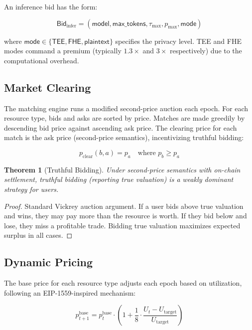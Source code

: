 \documentclass[11pt,a4paper]{article}
\newtheorem{theorem}{Theorem}
\begin{document}
An inference bid has the form:

\begin{equation}
    \mathsf{Bid}_{\text{infer}} = (\mathsf{model}, \mathsf{max\_tokens}, \tau_{\max}, p_{\max}, \mathsf{mode})
\end{equation}

where $\mathsf{mode} \in \{\mathsf{TEE}, \mathsf{FHE}, \mathsf{plaintext}\}$
specifies the privacy level. TEE and FHE modes command a premium (typically
$1.3\times$ and $3\times$ respectively) due to the computational overhead.

\subsection{Market Clearing}

The matching engine runs a modified second-price auction each epoch.
For each resource type, bids and asks are sorted by price. Matches
are made greedily by descending bid price against ascending ask price.
The clearing price for each match is the ask price (second-price
semantics), incentivizing truthful bidding:

\begin{equation}
    p_{\text{clear}}(b, a) = p_a \quad \text{where } p_b \geq p_a
\end{equation}

\begin{theorem}[Truthful Bidding]
Under second-price semantics with on-chain settlement, truthful bidding
(reporting true valuation) is a weakly dominant strategy for users.
\end{theorem}

\begin{proof}
Standard Vickrey auction argument. If a user bids above true valuation
and wins, they may pay more than the resource is worth. If they bid below
and lose, they miss a profitable trade. Bidding true valuation maximizes
expected surplus in all cases.
\end{proof}

\subsection{Dynamic Pricing}

The base price for each resource type adjusts each epoch based on
utilization, following an EIP-1559-inspired mechanism:

\begin{equation}\label{eq:pricing}
    p_{t+1}^{\text{base}} = p_t^{\text{base}} \cdot \left(1 + \frac{1}{8} \cdot \frac{U_t - U_{\text{target}}}{U_{\text{target}}}\right)
\end{equation}
\end{document}
